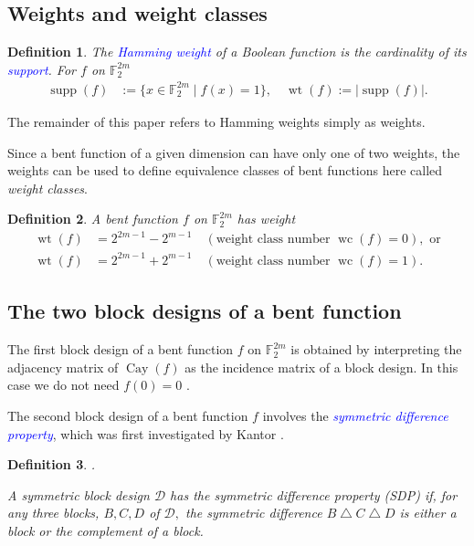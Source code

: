 \documentclass[12pt,a4paper]{article}
\newcommand{\mb}[1]{\mathbb{#1}}
\newcommand{\F}{\mb{F}}
\newcommand{\abs}[1]{\left| #1 \right|}
\newcommand{\Emph}[1]{\emph{\textcolor{blue}{#1}}}
\newcommand{\Cay}[1]{\operatorname{Cay}\left(#1\right)}
\newcommand{\support}[1]{\operatorname{supp}\left(#1\right)}
\newcommand{\weight}[1]{\operatorname{wt}\left(#1\right)}
\newcommand{\weightclass}[1]{\operatorname{wc}\left(#1\right)}
\newtheorem{Definition}{Definition}
\begin{document}
\subsection{Weights and weight classes}
\begin{Definition}
\label{def-weight}
The \Emph{Hamming weight} of a Boolean function is the cardinality of its \Emph{support}.
For $f$ on $\F_2^{2m}$
\begin{align*}
\support{f} &:= \{x \in \F_2^{2m} \mid f(x)=1 \}, \quad \weight{f} := \abs{ \support{f} }.
\end{align*}
\end{Definition}

The remainder of this paper refers to Hamming weights simply as weights.

Since a bent function of a given dimension can have only one of two weights,
the weights can be used to define equivalence classes of bent functions %
here called \emph{weight classes}.
\begin{Definition}
\label{def-weight-class}
A bent function $f$ on $\F_2^{2m}$ has weight \cite[Theorem 6.2.10]{Dil74}
\begin{align*}
\weight{f} &= 2^{2 m - 1} - 2^{m-1} \quad (\text{weight class number~} \weightclass{f}=0),
\text{~or}
\\
\weight{f} &= 2^{2 m - 1} + 2^{m-1} \quad (\text{weight class number~} \weightclass{f}=1).
\end{align*}
\end{Definition}

%
%

\subsection{The two block designs of a bent function}

The first block design of a bent function $f$ on $\F_2^{2m}$ is obtained by interpreting
the adjacency matrix of $\Cay{f}$ as the incidence matrix of a block design.
In this case we do not need $f(0)=0$ \cite[p. 160]{DilS87block}.

The second block design of a bent function $f$ involves the
\Emph{symmetric difference property}, which was first investigated by Kantor
\cite[Section 5]{Kan75symplectic}.
\begin{Definition}
\label{def-Symmetric-difference-property}
\cite[p. 49]{Kan75symplectic}.

A symmetric block design $\mathcal{D}$ has the symmetric difference property (SDP)
if, for any three blocks, $B, C, D$ of $\mathcal{D},$ the symmetric difference
$B \bigtriangleup C \bigtriangleup D$ is either a block or the complement of a block.
\end{Definition}
\end{document}
